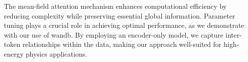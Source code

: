 The mean-field attention mechanism enhances computational efficiency by reducing complexity while preserving essential global information. Parameter tuning plays a crucial role in achieving optimal performance, as we demonstrate with our use of wandb. By employing an encoder-only model, we capture inter-token relationships within the data, making our approach well-suited for high-energy physics applications.

